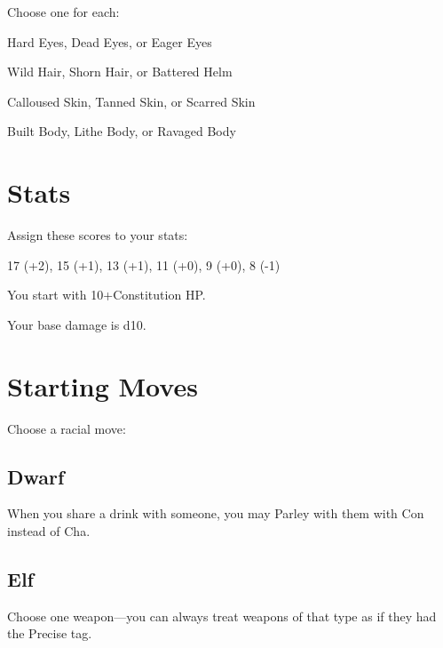Choose one for each:

 

Hard Eyes, Dead Eyes, or Eager Eyes

 

Wild Hair, Shorn Hair, or Battered Helm

 

Calloused Skin, Tanned Skin, or Scarred Skin

 

Built Body, Lithe Body, or Ravaged Body



 
\section{Stats}   
 



Assign these scores to your stats:

 

17 (+2), 15 (+1), 13 (+1), 11 (+0), 9 (+0), 8 (-1)

 

You start with 10+Constitution HP.



 

Your base damage is d10.

 
\section{Starting Moves}   
 


\startInstructionsAfterHeader
Choose a racial move:
\stopInstructionsAfterHeader
 


\subsection{Dwarf}   
 

When you share a drink with someone, you may Parley with them with Con instead of Cha.

 
\subsection{Elf}   
 

Choose one weapon—you can always treat weapons of that type as if they had the Precise tag.

